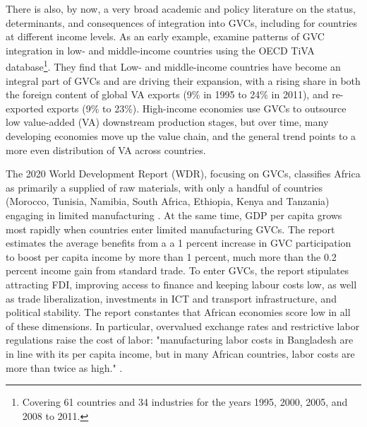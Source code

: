 \documentclass[a4paper]{article}
\begin{document}
There is also, by now, a very broad academic and policy literature on the status, determinants, and consequences of integration into GVCs, including for countries at different income levels. As an early example, \citet{Kummritz20162} examine patterns of GVC integration in low- and middle-income countries using the OECD TiVA database\footnote{Covering 61 countries and 34 industries for the years 1995, 2000, 2005, and 2008 to 2011.}. They find that %
Low- and middle-income countries have become an integral part of GVCs and are driving their expansion, with a rising share in both the foreign content of global VA exports (9\% in 1995 to 24\% in 2011), and re-exported exports (9\% to 23\%). High-income economies use GVCs to outsource low value-added (VA) downstream production stages, but over time, many developing economies move up the value chain, and the general trend points to a more even distribution of VA across countries. \newline %

The 2020 World Development Report (WDR), focusing on GVCs, classifies Africa as primarily a supplied of raw materials, with only a handful of countries (Morocco, Tunisia, Namibia, South Africa, Ethiopia, Kenya and Tanzania) engaging in limited manufacturing \citep{world2020trading}. At the same time, GDP per capita grows most rapidly when countries enter limited manufacturing GVCs. The report estimates the average benefits from a a 1 percent increase in GVC participation to boost per capita income by more than 1 percent, much more than the 0.2 percent income gain from standard trade. To enter GVCs, the report stipulates attracting FDI, improving access to finance and keeping labour costs low, as well as trade liberalization, investments in ICT and transport infrastructure, and political stability. The report constantes that African economies score low in all of these dimensions. In particular, overvalued exchange rates and restrictive labor
regulations raise the cost of labor: "manufacturing labor costs in Bangladesh are in line with its per capita income, but in many African countries, labor costs are more than twice as high." \citep{world2020trading}. \newline
\end{document}
